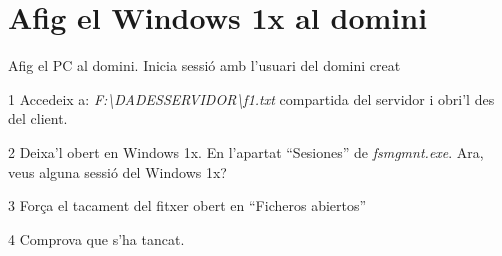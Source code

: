 \documentclass[
  a4paper,
]{article}
\begin{document}
\section{Afig el Windows 1x al
domini}\label{afig-el-windows-1x-al-domini}

Afig el PC al domini. Inicia sessió amb l'usuari del domini creat

1 Accedeix a: \emph{F:\textbackslash DADESSERVIDOR\textbackslash f1.txt}
compartida del servidor i obri'l des del client.

2 Deixa'l obert en Windows 1x. En l'apartat ``Sesiones'' de
\emph{fsmgmnt.exe}. Ara, veus alguna sessió del Windows 1x?

3 Força el tacament del fitxer obert en ``Ficheros abiertos''

4 Comprova que s'ha tancat.
\end{document}
